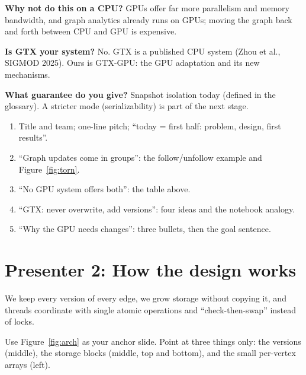 \documentclass[11pt,a4paper]{article}
\begin{document}
\begin{askme}
\textbf{Why not do this on a CPU?} GPUs offer far more parallelism and memory bandwidth, and graph analytics already
runs on GPUs; moving the graph back and forth between CPU and GPU is expensive.

\textbf{Is GTX your system?} No. GTX is a published CPU system (Zhou et al., SIGMOD 2025). Ours is GTX-GPU: the GPU
adaptation and its new mechanisms.

\textbf{What guarantee do you give?} Snapshot isolation today (defined in the glossary). A stricter mode
(serializability) is part of the next stage.
\end{askme}

\begin{slides}
\begin{enumerate}[leftmargin=*]
\item Title and team; one-line pitch; ``today = first half: problem, design, first results''.
\item ``Graph updates come in groups'': the follow/unfollow example and Figure~\ref{fig:torn}.
\item ``No GPU system offers both'': the table above.
\item ``GTX: never overwrite, add versions'': four ideas and the notebook analogy.
\item ``Why the GPU needs changes'': three bullets, then the goal sentence.
\end{enumerate}
\end{slides}

\newpage
\section{Presenter 2: How the design works}
\label{sec:p2}

\begin{oneline}
We keep every version of every edge, we grow storage without copying it, and threads coordinate with single atomic
operations and ``check-then-swap'' instead of locks.
\end{oneline}

Use Figure~\ref{fig:arch} as your anchor slide. Point at three things only: the versions (middle), the storage blocks
(middle, top and bottom), and the small per-vertex arrays (left).
\end{document}
